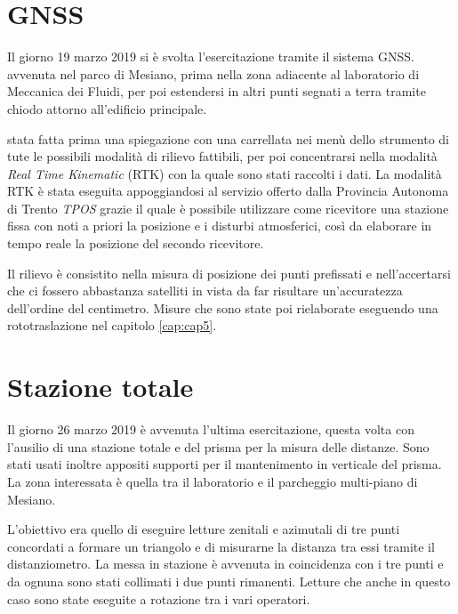 \section{GNSS}
Il giorno 19 marzo 2019 si è svolta l'esercitazione tramite il sistema GNSS. \e avvenuta nel parco di Mesiano, prima nella zona adiacente al laboratorio di Meccanica dei Fluidi, per poi estendersi in altri punti segnati a terra tramite chiodo attorno all'edificio principale.

\e stata fatta prima una spiegazione con una carrellata nei menù dello strumento di tute le possibili modalità di rilievo fattibili, per poi concentrarsi nella modalità \emph{Real Time Kinematic} (RTK) con la quale sono stati raccolti i dati.
La modalità RTK è stata eseguita appoggiandosi al servizio offerto dalla Provincia Autonoma di Trento \emph{TPOS} grazie il quale è possibile utilizzare come ricevitore una stazione fissa con noti a priori la posizione e i disturbi atmosferici, così da elaborare in tempo reale la posizione del secondo ricevitore.

Il rilievo è consistito nella misura di posizione dei punti prefissati e nell'accertarsi che ci fossero abbastanza satelliti in vista da far risultare un'accuratezza dell'ordine del centimetro. 
Misure che sono state poi rielaborate eseguendo una rototraslazione nel capitolo \ref{cap:cap5}.
\section{Stazione totale}
Il giorno 26 marzo 2019 è avvenuta l'ultima esercitazione, questa volta con l'ausilio di una stazione totale e del prisma per la misura delle distanze. 
Sono stati usati inoltre appositi supporti per il mantenimento in verticale del prisma.
La zona interessata è quella tra il laboratorio e il parcheggio multi-piano di Mesiano. 

L'obiettivo era quello di eseguire letture zenitali e azimutali di tre punti concordati a formare un triangolo e di misurarne la distanza tra essi tramite il distanziometro. 
La messa in stazione è avvenuta in coincidenza con i tre punti e da ognuna sono stati collimati i due punti rimanenti. 
Letture che anche in questo caso sono state eseguite a rotazione tra i vari operatori.